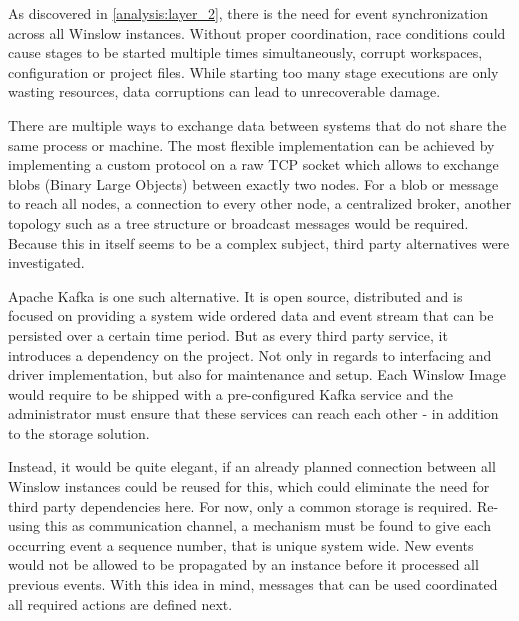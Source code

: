 As discovered in \autoref{analysis:layer_2}, there is the need for event synchronization across all Winslow instances.
Without proper coordination, race conditions could cause stages to be started multiple times simultaneously, corrupt workspaces, configuration or project files.
While starting too many stage executions are only wasting resources, data corruptions can lead to unrecoverable damage.

There are multiple ways to exchange data between systems that do not share the same process or machine.
The most flexible implementation can be achieved by implementing a custom protocol on a raw TCP socket which allows to exchange blobs (Binary Large Objects) between exactly two nodes.
For a blob or message to reach all nodes, a connection to every other node, a centralized broker, another topology such as a tree structure or broadcast messages would be required.
Because this in itself seems to be a complex subject, third party alternatives were investigated.

Apache Kafka\cite{kafka} is one such alternative.
It is open source, distributed and is focused on providing a system wide ordered data and event stream that can be persisted over a certain time period.
But as every third party service, it introduces a dependency on the project.
Not only in regards to interfacing and driver implementation, but also for maintenance and setup.
Each Winslow Image would require to be shipped with a pre-configured Kafka service and the administrator must ensure that these services can reach each other - in addition to the storage solution.

Instead, it would be quite elegant, if an already planned connection between all Winslow instances could be reused for this, which could eliminate the need for third party dependencies here.
For now, only a common storage is required.
Re-using this as communication channel, a mechanism must be found to give each occurring event a sequence number, that is unique system wide.
New events would not be allowed to be propagated by an instance before it processed all previous events.
With this idea in mind, messages that can be used coordinated all required actions are defined next.

